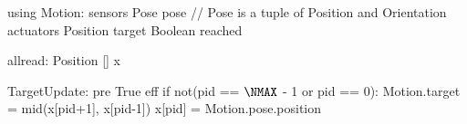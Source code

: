 using Motion:
  sensors Pose pose  // Pose is a tuple of Position and Orientation
  actuators
    Position target
    Boolean reached

allread: Position [] x $\label{lineformp}$

TargetUpdate:
  pre True
  eff if not(pid == $\NMAX$ - 1 or pid == 0):
     Motion.target = mid(x[pid+1], x[pid-1])
     x[pid] = Motion.pose.position